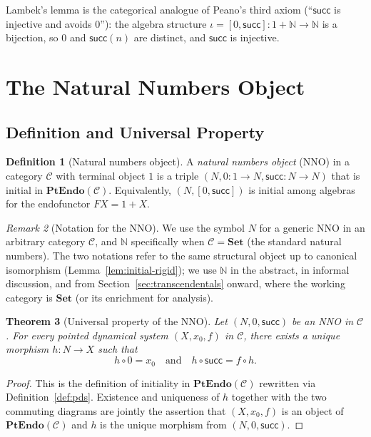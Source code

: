 \documentclass[12pt]{article}
\newtheorem{theorem}{Theorem}[section]
\theoremstyle{definition}
\newtheorem{definition}[theorem]{Definition}
\theoremstyle{remark}
\newtheorem{remark}[theorem]{Remark}
\newcommand{\N}{\mathbb{N}}
\newcommand{\Set}{\mathbf{Set}}
\newcommand{\suc}{\mathsf{succ}}
\newcommand{\PtEndo}{\mathbf{PtEndo}}
\begin{document}
Lambek's lemma is the categorical analogue of Peano's third axiom (``$\suc$ is injective and avoids $0$''): the algebra structure $\iota = [0, \suc] \colon 1 + \N \to \N$ is a bijection, so $0$ and $\suc(n)$ are distinct, and $\suc$ is injective.

\section{The Natural Numbers Object}
\label{sec:nno}

\subsection{Definition and Universal Property}

\begin{definition}[Natural numbers object]
\label{def:nno}
A \emph{natural numbers object} (NNO) in a category $\mathcal{C}$ with terminal object $1$ is a triple $(N, 0 \colon 1 \to N, \suc \colon N \to N)$ that is initial in $\PtEndo(\mathcal{C})$. Equivalently, $(N, [0, \suc])$ is initial among algebras for the endofunctor $F X = 1 + X$.
\end{definition}

\begin{remark}[Notation for the NNO]
We use the symbol $N$ for a generic NNO in an arbitrary category $\mathcal{C}$, and $\N$ specifically when $\mathcal{C} = \Set$ (the standard natural numbers). The two notations refer to the same structural object up to canonical isomorphism (Lemma~\ref{lem:initial-rigid}); we use $\N$ in the abstract, in informal discussion, and from Section~\ref{sec:transcendentals} onward, where the working category is $\Set$ (or its enrichment for analysis).
\end{remark}

\begin{theorem}[Universal property of the NNO]
\label{thm:nno-up}
Let $(N, 0, \suc)$ be an NNO in $\mathcal{C}$. For every pointed dynamical system $(X, x_0, f)$ in $\mathcal{C}$, there exists a unique morphism $h \colon N \to X$ such that
\begin{equation}
h \circ 0 = x_0 \quad \text{and} \quad h \circ \suc = f \circ h.
\label{eq:nno-up}
\end{equation}
\end{theorem}

\begin{proof}
This is the definition of initiality in $\PtEndo(\mathcal{C})$ rewritten via Definition~\ref{def:pds}. Existence and uniqueness of $h$ together with the two commuting diagrams are jointly the assertion that $(X, x_0, f)$ is an object of $\PtEndo(\mathcal{C})$ and $h$ is the unique morphism from $(N, 0, \suc)$.
\end{proof}
\end{document}
